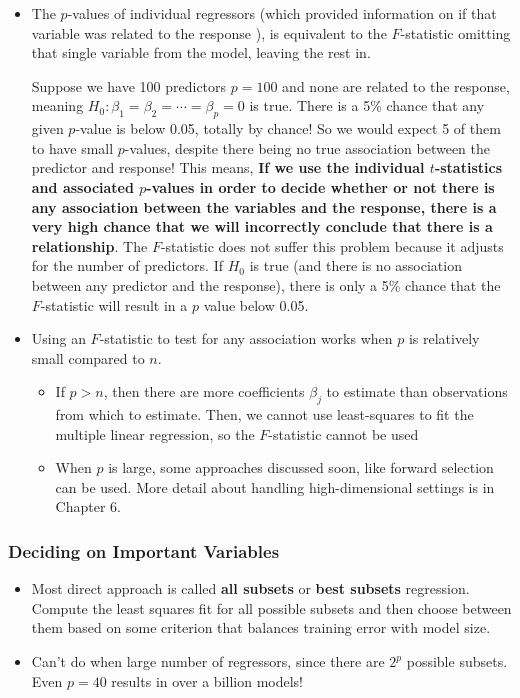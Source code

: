 			\begin{itemize}
				\item  The $p$-values of individual regressors (which provided information on if that variable was related to the response ), is equivalent to the $F$-statistic omitting that single variable from the model, leaving the rest in.
					\begin{warning}
					Suppose we have 100 predictors $p=100$ and none are related to the response, meaning $H_0: \beta_1 = \beta_2 = \cdots = \beta_p = 0$ is true.  There is a 5\% chance that any given $p$-value is below 0.05, totally by chance!  So we would expect 5 of them to have small $p$-values, despite there being no true association between the predictor and response!  This means, \textbf{If we use the individual $t$-statistics and associated $p$-values in order to decide whether or not there is any association between the variables and the response, there is a very high chance that we will incorrectly conclude that there is a relationship}.  The $F$-statistic does not suffer this problem because it adjusts for the number of predictors.  If $H_0$ is true (and there is no association between any predictor and the response), there is only a 5\% chance that the $F$-statistic will result in a $p$ value below 0.05.
				\end{warning}
				\item  Using an $F$-statistic to test for any association works when $p$ is relatively small compared to $n$.
				\begin{itemize}
					\item  If $p > n$, then there are more coefficients $\beta_j$ to estimate than observations from which to estimate.  Then, we cannot use least-squares to fit the multiple linear regression, so the $F$-statistic cannot be used 
					\item   When $p$ is large, some approaches discussed soon, like forward selection can be used.  More detail about handling high-dimensional settings is in Chapter 6.
				\end{itemize}
			\end{itemize}
		
            

           

         \subsubsection*{Deciding on Important Variables}
         \begin{itemize}
             \item Most direct approach is called \textbf{all subsets} or \textbf{best subsets} regression.  Compute the least squares fit for all possible subsets and then choose between them based on some criterion that balances training error with model size.
             \item Can't do when large number of regressors, since there are $2^p$ possible subsets.  Even $p=40$ results in over a billion models!
         \end{itemize}
